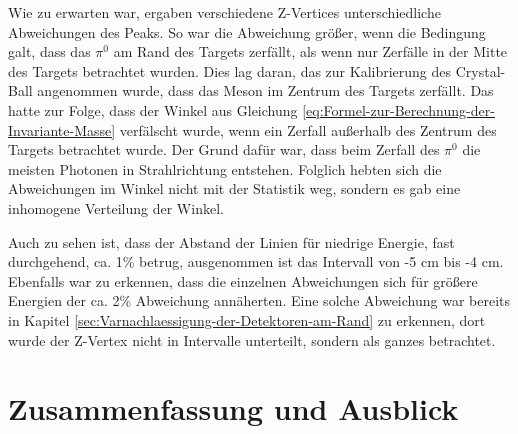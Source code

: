 \documentclass[a4paper,11pt,oneside,final,german,openbib,pdftex]{scrbook}
\begin{document}
Wie zu erwarten war, ergaben verschiedene Z-Vertices unterschiedliche Abweichungen des Peaks. So war die Abweichung gr\"o{\ss}er, wenn die Bedingung galt, dass das $\pi^0$ am Rand des Targets zerf\"allt, als wenn nur Zerf\"alle in der Mitte des Targets betrachtet wurden. Dies lag daran, das zur Kalibrierung des Crystal-Ball angenommen wurde, dass das Meson im Zentrum des Targets zerf\"allt. Das hatte zur Folge, dass der Winkel aus Gleichung \ref{eq:Formel-zur-Berechnung-der-Invariante-Masse} verf\"alscht wurde, wenn ein Zerfall au{\ss}erhalb des Zentrum des Targets betrachtet wurde. Der Grund daf\"ur war, dass beim Zerfall des $\pi^0$ die meisten Photonen in Strahlrichtung entstehen. Folglich hebten sich die Abweichungen im Winkel nicht mit der Statistik weg, sondern es gab eine inhomogene Verteilung der Winkel. 
  
Auch zu sehen ist, dass der Abstand der Linien f\"ur niedrige Energie, fast durchgehend, ca. 1\% betrug, ausgenommen ist das Intervall von -5 cm bis -4 cm. Ebenfalls war zu erkennen, dass die einzelnen Abweichungen sich f\"ur gr\"o{\ss}ere Energien der ca. 2\% Abweichung ann\"aherten. Eine solche Abweichung war bereits in Kapitel \ref{sec:Varnachlaessigung-der-Detektoren-am-Rand} zu erkennen, dort wurde der Z-Vertex nicht in Intervalle unterteilt, sondern als ganzes betrachtet.


\chapter{Zusammenfassung und Ausblick}

\end{document}

